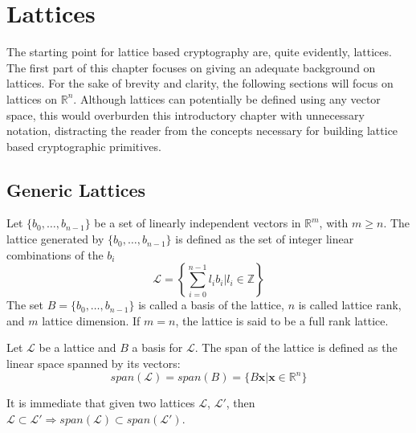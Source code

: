 \section{Lattices}

The starting point for lattice based cryptography are, quite evidently, lattices. The first part of this chapter focuses on giving an adequate background on lattices. For the sake of brevity and clarity, the following sections will focus on lattices on $\mathbb{R}^n$. Although lattices can potentially be defined using any vector space, this would overburden this introductory chapter with unnecessary notation, distracting the reader from the concepts necessary for building lattice based cryptographic primitives.

\subsection{Generic Lattices}\label{sec:bg:g_lattice}

\begin{definition}[Lattice]
Let $\{b_0,\ldots,b_{n-1}\}$ be a set of linearly independent vectors in $\mathbb{R}^m$, with $m\geq n$. The lattice generated by $\{b_0,\ldots,b_{n-1}\}$ is defined as the set of integer linear combinations of the $b_i$
\begin{equation*}
\mathscr{L}=\left\{\sum_{i=0}^{n-1}l_ib_i | l_i\in\mathbb{Z}\right\}
\end{equation*}
The set $B=\{b_0,\ldots,b_{n-1}\}$ is called a basis of the lattice, $n$ is called lattice rank, and $m$ lattice dimension. If $m=n$, the lattice is said to be a full rank lattice.
\end{definition}

\begin{definition}
Let $\mathscr{L}$ be a lattice and $B$ a basis for $\mathscr{L}$. The span of the lattice is defined as the linear space spanned by its vectors:
\begin{equation*}
span(\mathscr{L}) = span(B) = \{B\mathbf{x}|\mathbf{x}\in\mathbb{R}^n\}
\end{equation*} 
\end{definition}

\begin{remark}
It is immediate that given two lattices $\mathscr{L}$, $\mathscr{L}'$, then $\mathscr{L}\subset \mathscr{L}' \Rightarrow span(\mathscr{L}) \subset span(\mathscr{L}')$.
\end{remark}

